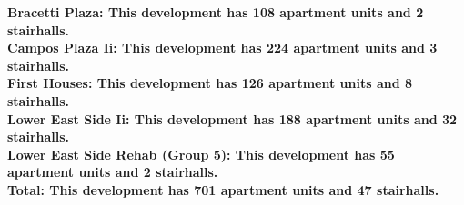\bf{Bracetti Plaza}: This development has 108 apartment units and 2 stairhalls.\\\bf{Campos Plaza Ii}: This development has 224 apartment units and 3 stairhalls.\\\bf{First Houses}: This development has 126 apartment units and 8 stairhalls.\\\bf{Lower East Side Ii}: This development has 188 apartment units and 32 stairhalls.\\\bf{Lower East Side Rehab (Group 5)}: This development has 55 apartment units and 2 stairhalls.\\\bf{Total}: This development has 701 apartment units and 47 stairhalls.\\